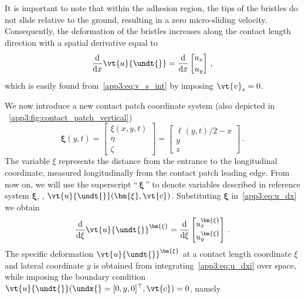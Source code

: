 It is important to note that within the adhesion region, the tips of the bristles do not slide relative to the ground, resulting in a zero micro-sliding velocity. Consequently, the deformation of the bristles increases along the contact length direction with a spatial derivative equal to
%
\begin{equation}
  \dfrac{\mathrm{d}}{\mathrm{d}x}\vt{u}{\undt{}} =
  \dfrac{\mathrm{d}}{\mathrm{d}x}
  \begin{bmatrix}
    u_x \\[0.2em]
    u_y
  \end{bmatrix} \, \text{,}
  \label{app3:eq:u_dx}
\end{equation}
%
which is easily found from~\eqref{app3:eq:v_s_int} by imposing $\vt{v}_s = 0$.

We now introduce a new contact patch coordinate system (also depicted in \figurename~\ref{app3:fig:contact_patch_vertical})
%
\begin{equation*}
  \bm{\xi}(y,t) =
  \begin{bmatrix}
    \xi(x,y,t) \\[0.2em]
    \eta \\[0.2em]
    \zeta
  \end{bmatrix}
  =
  \begin{bmatrix}
    \ell(y,t)/2-x \\[0.2em]
    y \\[0.2em]
    z
  \end{bmatrix} \, \text{.}
\end{equation*}
%
The variable $\xi$ represents the distance from the entrance to the longitudinal coordinate, measured longitudinally from the contact patch leading edge. From now on, we will use the superscript ``$\,\bm{\xi}\,$'' to denote variables described in reference system $\bm{\xi}$, \eg{}, $\vt{u}{\undt{}}(\bm{\xi},\vt{c})$. Substituting $\bm{\xi}$ in~\eqref{app3:eq:u_dx} we obtain
%
\begin{equation}
  \dfrac{\mathrm{d}}{\mathrm{d}\xi}\vt{u}{\undt{}}^{\bm{\xi}} =
  \dfrac{\mathrm{d}}{\mathrm{d}\xi}
  \begin{bmatrix}
    u_{x}^{\bm{\xi}} \\[0.2em]
    u_{y}^{\bm{\xi}}
  \end{bmatrix} \, \text{.}
  \label{app3:eq:u_dxi}
\end{equation}
%
The specific deformation $\vt{u}{\undt{}}^{\bm{\xi}}$ at a contact length coordinate $\xi$ and lateral coordinate $y$ is obtained from integrating~\eqref{app3:eq:u_dxi} over space, while imposing the boundary condition $\vt{u}{\undt{}}(\undx{} = [0,y,0]^\top,\vt{c}) = 0$, namely
